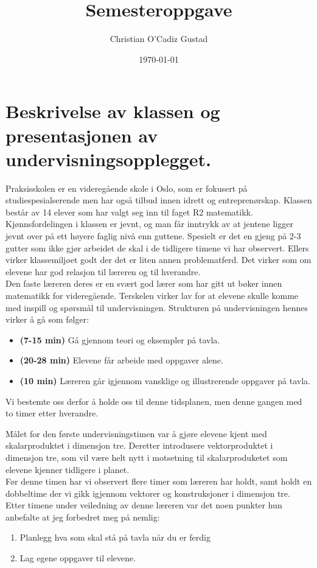 \documentclass[11pt]{article}
\author{Christian O'Cadiz Gustad}
\date{\today}
\title{Semesteroppgave}
\begin{document}
\maketitle



\section{Beskrivelse av klassen og presentasjonen av undervisningsopplegget.}
\label{sec-1}

Praksisskolen er en videregående skole i Oslo, som er fokusert på studiespesialserende men har også tilbud innen idrett og entreprenørskap. Klassen består av 14 elever som har valgt seg inn til faget R2 matematikk. Kjønnsfordelingen i klassen er jevnt, og man får inntrykk av at jentene ligger jevnt over på ett høyere faglig nivå enn guttene. Spesielt er det en gjeng på 2-3 gutter som ikke gjør arbeidet de skal i de tidligere timene vi har observert. Ellers virker klassemiljøet godt der det er liten annen problematferd. Det virker som om elevene har god relasjon til læreren og til hverandre.\\

Den faste læreren deres er en svært god lærer som har gitt ut bøker innen matematikk for videregående. Terskelen virker lav for at elevene skulle  komme med inspill og spørsmål til undervisningen. 
Strukturen på undervisningen hennes virker å gå som følger:
\begin{itemize}
\item \textbf{(7-15 min)} Gå gjennom teori og eksempler på tavla.
\item \textbf{(20-28 min)} Elevene får arbeide med oppgaver alene.
\item \textbf{(10 min)} Læreren går igjennom vansklige og illustrerende oppgaver på tavla.
\end{itemize}
Vi bestemte oss derfor å holde oss til denne tidsplanen, men denne gangen med to timer etter hverandre.

Målet for den første undervisningstimen var å gjøre elevene kjent med skalarproduktet i dimensjon tre. Deretter introdusere vektorproduktet i dimensjon tre, som vil være helt nytt i motsetning til skalarproduketet som elevene kjenner tidligere i planet.\\

Før denne timen har vi observert flere timer som læreren har holdt, samt holdt en dobbeltime der vi gikk igjennom vektorer og konstruksjoner i dimensjon tre.\\
Etter  timene under veiledning av denne læreren var det noen punkter hun anbefalte at jeg forbedret meg på nemlig:
\begin{enumerate}
\item Planlegg hva som skal stå på tavla når du er ferdig
\item Lag egene oppgaver til elevene.
\end{enumerate}







\end{document}

